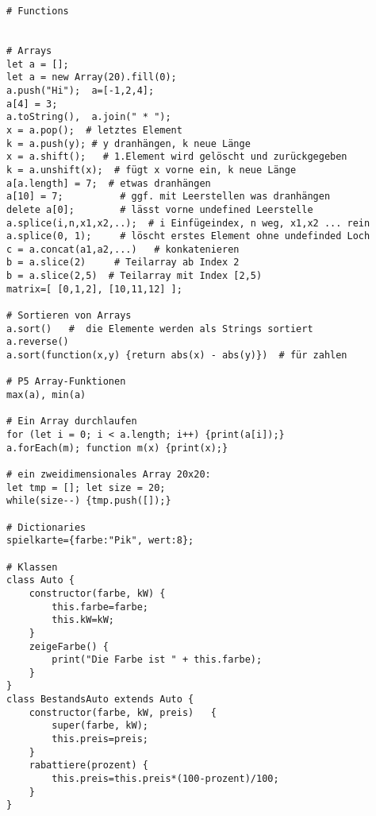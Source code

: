 \documentclass[a4paper,11pt,landscape,twocolumn]{book}
\begin{document}
\begin{lstlisting}
# Functions


# Arrays
let a = [];
let a = new Array(20).fill(0);
a.push("Hi");  a=[-1,2,4];
a[4] = 3; 
a.toString(),  a.join(" * ");
x = a.pop();  # letztes Element
k = a.push(y); # y dranhängen, k neue Länge
x = a.shift();   # 1.Element wird gelöscht und zurückgegeben
k = a.unshift(x);  # fügt x vorne ein, k neue Länge
a[a.length] = 7;  # etwas dranhängen
a[10] = 7;          # ggf. mit Leerstellen was dranhängen
delete a[0];        # lässt vorne undefined Leerstelle  
a.splice(i,n,x1,x2,..);  # i Einfügeindex, n weg, x1,x2 ... rein
a.splice(0, 1);     # löscht erstes Element ohne undefinded Loch
c = a.concat(a1,a2,...)   # konkatenieren
b = a.slice(2)     # Teilarray ab Index 2
b = a.slice(2,5)  # Teilarray mit Index [2,5)
matrix=[ [0,1,2], [10,11,12] ];

# Sortieren von Arrays
a.sort()   #  die Elemente werden als Strings sortiert
a.reverse()
a.sort(function(x,y) {return abs(x) - abs(y)})  # für zahlen

# P5 Array-Funktionen
max(a), min(a)

# Ein Array durchlaufen
for (let i = 0; i < a.length; i++) {print(a[i]);}
a.forEach(m); function m(x) {print(x);}

# ein zweidimensionales Array 20x20:
let tmp = []; let size = 20;
while(size--) {tmp.push([]);}
      
# Dictionaries
spielkarte={farbe:"Pik", wert:8};

# Klassen
class Auto {
	constructor(farbe, kW) {
		this.farbe=farbe;
		this.kW=kW;
	}
	zeigeFarbe() {
		print("Die Farbe ist " + this.farbe);
	}
}
class BestandsAuto extends Auto {
	constructor(farbe, kW, preis)	{
		super(farbe, kW);
		this.preis=preis;
	}
	rabattiere(prozent)	{
		this.preis=this.preis*(100-prozent)/100;
	}
}
\end{lstlisting} 
\end{document}
